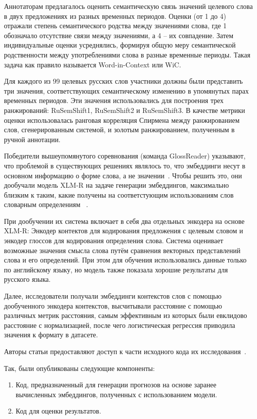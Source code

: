 \documentclass[LI,VKR]{HSEUniversity}
\begin{document}
Аннотаторам предлагалось оценить семантическую связь значений целевого слова в двух предложениях
из разных временных периодов.
Оценки (от 1 до 4) отражали степень семантического родства между значениями слова, где
1 обозначало отсутствие связи между значениями, а 4 – их совпадение.
Затем индивидуальные оценки усреднялись, формируя общую меру семантической родственности между
употреблениями слова в разные временные периоды.
Такая задача как правило называется Word-in-Context или WiC.

Для каждого из 99 целевых русских слов участники должны
были представить три значения, соответствующих семантическому изменению в упомянутых парах
временных периодов.
Эти значения использовались для построения трех ранжирований:
RuSemShift1, RuSemShift2 и RuSemShift3.
В качестве метрики оценки использовалась ранговая корреляция Спирмена между ранжированием слов,
сгенерированным системой, и золотым ранжированием, полученным в ручной аннотации.

Победители вышеупомянутого соревнования (команда GlossReader) указывают,
что проблемой в существующих решениях являлось то,
что эмбеддинги несут в основном информацию о форме слова, а не значении~\cite{GlossReader}.
Чтобы решить это, они дообучали модель XLM-R на задаче генерации эмбеддингов, максимально близким
к таким, какие получены на соответстующим использованиям слов словарным определениям
~\cite{XLM-R}.

При дообучении их система включает в себя два отдельных энкодера на основе XLM-R:
Энкодер контектов для кодирования предложения с целевым словом и
энкодер глоссов для кодирования определения слова.
Система оценивает возможные значения смысла слова путём сравнения векторных представлений слова
и его определений.
При этом для обучения использовались данные только по английскому языку,
но модель также показала хорошие результаты для русского языка.

Далее, исследователи получали эмбеддинги контекстов слов с помощью
дообученного энкодера контекстов, высчитывали расстояние с помощью различных метрик расстояния,
самым эффективным из которых были евклидово расстояние с нормализацией, после чего
логистическая регрессия приводила значения к формату в датасете.

Авторы статьи предоставляют доступ к части исходного кода их исследования~\cite{GlossReaderGitHub}.

Так, были опубликованы следующие компоненты:
\begin{enumerate}
    \item Код, предназначенный для генерации прогнозов на основе заранее вычисленных эмбеддингов,
полученных с использованием модели.
    \item Код для оценки результатов.
\end{enumerate}
\end{document}
